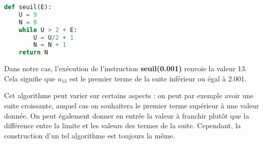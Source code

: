 \documentclass[11pt,fleqn, openany]{book} %
\begin{document}
\begin{example}
\begin{lstlisting}[language=python]
def seuil(E):
	U = 9
	N = 0
	while U > 2 + E:
		U = U/2 + 1
		N = N + 1
	return N
\end{lstlisting}

Dans notre cas, l'exécution de l'instruction \textbf{seuil(0.001)} renvoie la valeur 13. Cela signifie que $u_{13}$ est le premier terme de la suite inférieur ou égal à 2.001.\end{example}

Cet algorithme peut varier sur certains aspects : on peut par exemple avoir une suite croissante, auquel cas on souhaitera le premier terme supérieur à une valeur donnée. On peut également donner en entrée la valeur à franchir plutôt que la différence entre la limite et les valeurs des termes de la suite. Cependant, la construction d'un tel algorithme est toujours la même.
\end{document}
